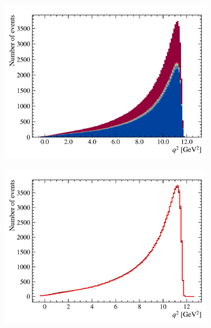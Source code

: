 \begin{figure}[htb]
\begin{subfigure}[b]{0.32\textwidth}
        \includegraphics[width=\textwidth]{figs-fit-fit-templates/data-driven-plots/misid/D0_q2_smr.pdf}
    \end{subfigure}
    \hfill
    \begin{subfigure}[b]{0.32\textwidth}
        \centering
        \includegraphics[width=\textwidth]{figs-fit-fit-templates/data-driven-plots/misid/D0_q2_comp.pdf}
    \end{subfigure}
    \\
    \begin{subfigure}[b]{0.32\textwidth}
        \centering

\end{subfigure}
\end{figure}
